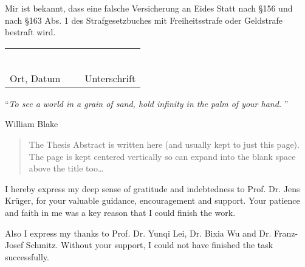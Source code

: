 \documentclass[
11pt, %
oneside, %
english, %
singlespacing, %
parskip, %
headsepline, %
]{MastersDoctoralThesis} %
\begin{document}
\begin{declaration}
\noindent Mir ist bekannt, dass eine falsche Versicherung an Eides Statt nach \S 156 und nach \S 163 Abs. 1 des Strafgesetzbuches mit Freiheitsstrafe oder Geldstrafe bestraft wird.\\[.4cm]


\begin{center}
	\begin{tabu} to .95\textwidth { X[l] X[c] X[r] }
		~ & ~ & ~ \\
		  \\
		Ort, Datum  & ~  & Unterschrift \\
	\end{tabu}
\end{center}

\end{declaration}

\cleardoublepage


\vspace*{0.2\textheight}

\noindent\enquote{\itshape To see a world in a grain of sand, hold infinity in the palm of your hand. }\bigbreak

\hfill William Blake


\begin{abstract}
\addchaptertocentry{\abstractname} %
The Thesis Abstract is written here (and usually kept to just this page). The page is kept centered vertically so can expand into the blank space above the title too\ldots
\end{abstract}


\begin{acknowledgements}
\addchaptertocentry{\acknowledgementname} %
I hereby express my deep sense of gratitude and indebtedness to Prof. Dr. Jens Krüger, for your valuable guidance, encouragement and support. Your patience and faith in me was a key reason that I could finish the work.

\noindent Also I express my thanks to Prof. Dr. Yunqi Lei, Dr. Bixia Wu and Dr. Franz-Josef Schmitz. Without your support, I could not have finished the task successfully.
\end{acknowledgements}
\end{document}
